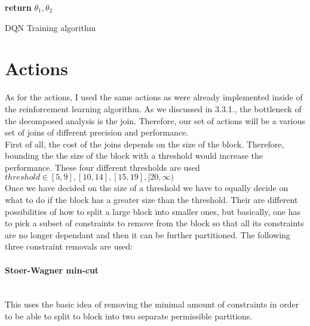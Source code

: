 \begin{center}
\begin{algorithm}[H]
{{     \Indm
     \Indp{}
		\Indm
	\Indp{}\Indm
	\Indp{}
			
    }
    
   }
   \textbf{return} $\theta_1,\theta_2$
    
\caption{DQN Training algorithm}
\end{algorithm}
\end{center}
\section{Actions}
As for the actions, I used the same actions as were already implemented inside of the reinforcement learning algorithm. As we discussed in 3.3.1., the bottleneck of the decomposed analysis is the join. Therefore, our set of actions will be a various set of joins of different precision and performance.\\
First of all, the cost of the joins depends on the size of the block. Therefore, bounding the the size of the block with a threshold would increase the performance. These four different thresholds are used $threshold \in [5,9],[10,14],[15,19],[20,\infty)$\\
Once we have decided on the size of a threshold we have to equally decide on what to do if the block has a greater size than the threshold. Their are different possibilities of how to split a large block into smaller ones, but basically, one has to pick a subset of constraints to remove from the block so that all its constraints are no longer dependant and then it can be further partitioned. The following three constraint removals are used:
\paragraph{Stoer-Wagner min-cut}\mbox{}\\
This uses the basic idea of removing the minimal amount of constraints in order to be able to split to block into two separate permissible partitions.
